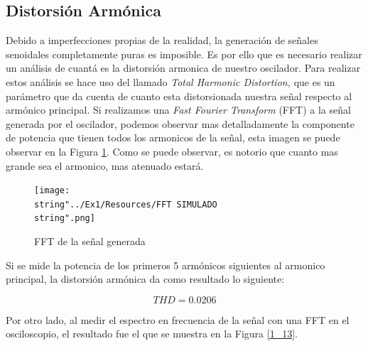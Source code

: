 \subsection{Distorsión Armónica}

Debido a imperfecciones propias de la realidad, la generación de señales
senoidales completamente puras es imposible. Es por ello que es necesario
realizar un análisis de cuantá es la distorsión armonica de nuestro
oscilador. Para realizar estos análisis se hace uso del llamado \emph{Total
Harmonic Distortion, }que es un parámetro que da cuenta de cuanto
esta distorsionada nuestra señal respecto al armónico principal. Si
realizamos una \emph{Fast Fourier Transform} (FFT) a la señal generada
por el oscilador, podemos observar mas detalladamente la componente
de potencia que tienen todos los armonicos de la señal, esta imagen
se puede observar en la Figura \ref{1_12}. Como se puede observar,
es notorio que cuanto mas grande sea el armonico, mas atenuado estará.

\begin{figure}[H]
\begin{centering}
\texttt{[image: \\string"../Ex1/Resources/FFT SIMULADO\\string".png]}
\par\end{centering}
\caption{FFT de la señal generada}
\label{1_12}

\end{figure}

Si se mide la potencia de los primeros 5 armónicos siguientes al armonico
principal, la distorsión armónica da como resultado lo siguiente:

\[
THD=0.0206
\]

Por otro lado, al medir el espectro en frecuencia de la señal con
una FFT en el osciloscopio, el resultado fue el que se muestra en
la Figura \ref{1_13}.

